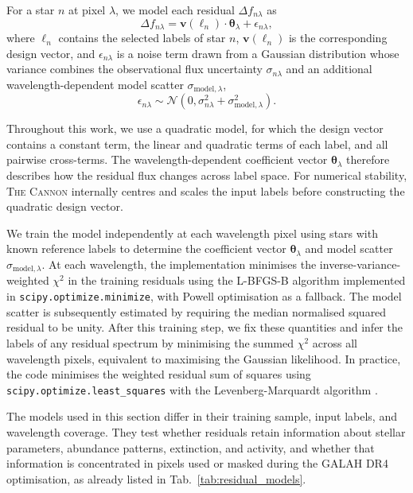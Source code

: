 \documentclass[twocolumn,apj,numberedappendix,appendixfloats]{openjournal}
\begin{document}
For a star $n$ at pixel $\lambda$, we model each residual $\Delta f_{n\lambda}$ as
\begin{equation}
\Delta f_{n\lambda}
=
\boldsymbol{v}(\boldsymbol{\ell}_n) \cdot \boldsymbol{\theta}_{\lambda} + \epsilon_{n\lambda},
\label{eq:cannon_residual_model}
\end{equation}
where $\boldsymbol{\ell}_n$ contains the selected labels of star $n$, $\boldsymbol{v}(\boldsymbol{\ell}_n)$ is the corresponding design vector, and $\epsilon_{n\lambda}$ is a noise term drawn from a Gaussian distribution whose variance combines the observational flux uncertainty $\sigma_{n\lambda}$ and an additional wavelength-dependent model scatter $\sigma_{\mathrm{model},\lambda}$,
\begin{equation}
\epsilon_{n\lambda} \sim \mathcal{N}\left(0, \sigma_{n\lambda}^{2}+\sigma_{\mathrm{model},\lambda}^{2}\right).
\end{equation}

Throughout this work, we use a quadratic model, for which the design vector contains a constant term, the linear and quadratic terms of each label, and all pairwise cross-terms. The wavelength-dependent coefficient vector $\boldsymbol{\theta}_{\lambda}$ therefore describes how the residual flux changes across label space. For numerical stability, \textsc{The Cannon} internally centres and scales the input labels before constructing the quadratic design vector.

We train the model independently at each wavelength pixel using stars with known reference labels to determine the coefficient vector $\boldsymbol{\theta}_{\lambda}$ and model scatter $\sigma_{\mathrm{model},\lambda}$. At each wavelength, the implementation minimises the inverse-variance-weighted $\chi^2$ in the training residuals using the L-BFGS-B algorithm implemented in \texttt{scipy.optimize.minimize}, with Powell optimisation as a fallback. The model scatter is subsequently estimated by requiring the median normalised squared residual to be unity. After this training step, we fix these quantities and infer the labels of any residual spectrum by minimising the summed $\chi^2$ across all wavelength pixels, equivalent to maximising the Gaussian likelihood. In practice, the code minimises the weighted residual sum of squares using \texttt{scipy.optimize.least\_squares} with the Levenberg-Marquardt algorithm \citep{Scipy}.

The models used in this section differ in their training sample, input labels, and wavelength coverage. They test whether residuals retain information about stellar parameters, abundance patterns, extinction, and activity, and whether that information is concentrated in pixels used or masked during the GALAH DR4 optimisation, as already listed in Tab.~\ref{tab:residual_models}.
\end{document}

